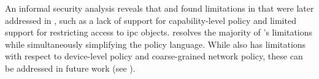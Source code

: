 An informal security analysis reveals that \bpfbox{} and \bpfcontain{} found limitations
in \bpfbox{} that were later addressed in \bpfcontain{}, such as a lack of support for
capability-level policy and limited support for restricting access to \gls{ipc} objects.
\bpfcontain{} resolves the majority of \bpfbox{}'s limitations while simultaneously
simplifying the policy language. While \bpfcontain{} also has limitations with respect to
device-level policy and coarse-grained network policy, these can be addressed in future
work (see ).


